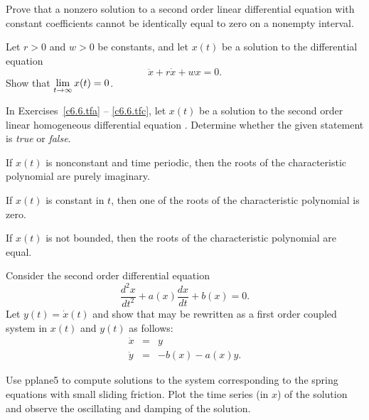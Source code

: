 \documentclass{ximera}
\begin{document}
\begin{exercise} \label{c6.7.3}
Prove that a nonzero solution to a second order linear differential equation
with constant coefficients cannot be identically equal to zero on a nonempty
interval.
\end{exercise}

\begin{exercise} \label{c6.7.4}
Let $r>0$ and $w>0$ be constants, and let $x(t)$ be a solution to the
differential equation
\[
\ddot{x} + r\dot{x} + wx = 0.
\]
Show that $\displaystyle\lim_{t\to\infty} x(t) = 0$.
\end{exercise}

\noindent In Exercises~\ref{c6.6.tfa} -- \ref{c6.6.tfc}, let $x(t)$ be a
solution to the second order linear homogeneous differential equation
.  Determine whether the given statement is {\em true\/}
or {\em false}.
\begin{exercise} \label{c6.6.tfa}
If $x(t)$ is nonconstant and time periodic, then the
roots of the characteristic polynomial are purely imaginary.
\end{exercise}
\begin{exercise} \label{c6.6.tfb}
If $x(t)$ is constant in $t$, then one of the roots of
the characteristic polynomial is zero.
\end{exercise}
\begin{exercise} \label{c6.6.tfc}
If $x(t)$ is not bounded, then the roots of the characteristic
polynomial are equal.
\end{exercise}

\begin{exercise} \label{c3.5.5}
Consider the second order differential equation
\begin{equation}  \label{E:2ndorder}
\frac{d^2x}{dt^2} + a(x)\frac{dx}{dt} + b(x) = 0.
\end{equation}
Let $y(t)=\dot{x}(t)$ and show that  may be
rewritten as a first order coupled system in $x(t)$ and $y(t)$
as follows:
\begin{eqnarray*}
\dot{x} & = & y \\
\dot{y} & = & -b(x) - a(x) y.
\end{eqnarray*}
\end{exercise}


\CEXER

\begin{exercise} \label{c6.7.5}
Use {\sf pplane5} to compute solutions to the system corresponding to the
spring equations with small sliding friction.  Plot the time series (in $x$)
of the solution and observe the oscillating and damping of the solution.
\end{exercise}
\end{document}
